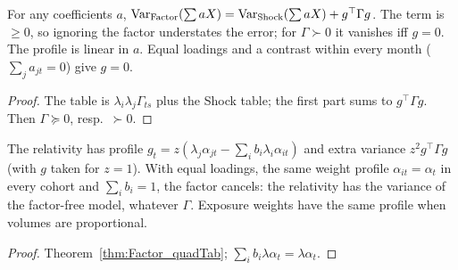 \begin{theorem}\label{thm:Factor_quadTab}
  \leanok
  For any coefficients $a$,
  $\operatorname{Var}_{\mathrm{Factor}}(\sum aX) = \operatorname{Var}_{\mathrm{Shock}}(\sum aX) + g^\top\Gamma g$. The term is
  $\ge 0$, so ignoring the factor understates the error; for $\Gamma \succ 0$ it vanishes iff
  $g = 0$. The profile is linear in $a$. Equal loadings and a contrast within every month
  ($\sum_j a_{jt} = 0$) give $g = 0$.
\end{theorem}
\begin{proof}
  \leanok
  The table is $\lambda_i\lambda_j\Gamma_{ts}$ plus the Shock table; the first part sums to
  $g^\top\Gamma g$. Then $\Gamma \succeq 0$, resp.\ $\succ 0$.
\end{proof}

\begin{theorem}\label{thm:Factor_relCoef}
  \leanok
  The relativity has profile $g_t = z(\lambda_j\alpha_{jt} - \sum_i b_i\lambda_i\alpha_{it})$ and
  extra variance $z^2 g^\top\Gamma g$ (with $g$ taken for $z = 1$). With equal loadings, the same
  weight profile $\alpha_{it} = \alpha_t$ in every cohort and $\sum_i b_i = 1$, the factor cancels:
  the relativity has the variance of the factor-free model, whatever $\Gamma$. Exposure weights
  have the same profile when volumes are proportional.
\end{theorem}
\begin{proof}
  \leanok
  Theorem~\ref{thm:Factor_quadTab}; $\sum_i b_i\lambda\alpha_t = \lambda\alpha_t$.
\end{proof}

